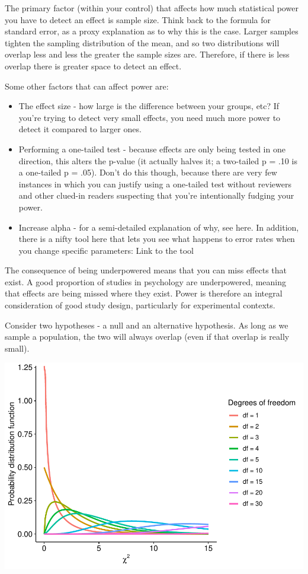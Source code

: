 \documentclass[
]{book}
\providecommand{\tightlist}{%
  \setlength{\itemsep}{0pt}\setlength{\parskip}{0pt}}
\begin{document}
The primary factor (within your control) that affects how much statistical power you have to detect an effect is sample size. Think back to the formula for standard error, as a proxy explanation as to why this is the case. Larger samples tighten the sampling distribution of the mean, and so two distributions will overlap less and less the greater the sample sizes are. Therefore, if there is less overlap there is greater space to detect an effect.

Some other factors that can affect power are:

\begin{itemize}
\tightlist
\item
  The effect size - how large is the difference between your groups, etc? If you're trying to detect very small effects, you need much more power to detect it compared to larger ones.
\item
  Performing a one-tailed test - because effects are only being tested in one direction, this alters the p-value (it actually halves it; a two-tailed p = .10 is a one-tailed p = .05). Don't do this though, because there are very few instances in which you can justify using a one-tailed test without reviewers and other clued-in readers suspecting that you're intentionally fudging your power.
\item
  Increase alpha - for a semi-detailed explanation of why, see here. In addition, there is a nifty tool here that lets you see what happens to error rates when you change specific parameters: Link to the tool
\end{itemize}

The consequence of being underpowered means that you can miss effects that exist. A good proportion of studies in psychology are underpowered, meaning that effects are being missed where they exist. Power is therefore an integral consideration of good study design, particularly for experimental contexts.

Consider two hypotheses - a null and an alternative hypothesis. As long as we sample a population, the two will always overlap (even if that overlap is really small).

\includegraphics{_main_files/figure-latex/unnamed-chunk-95-1.pdf}
\end{document}
